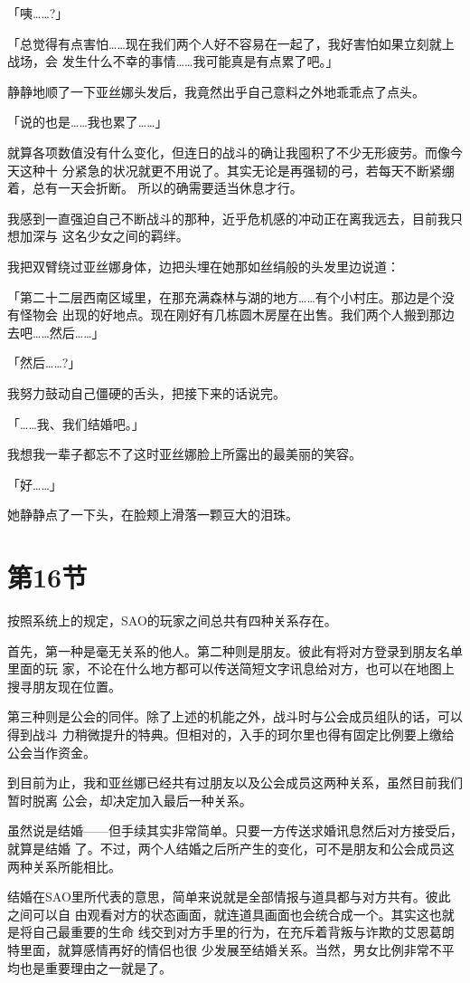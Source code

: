 \documentclass[11pt]{book}
\begin{document}
「咦……?」

「总觉得有点害怕……现在我们两个人好不容易在一起了，我好害怕如果立刻就上战场，会
发生什么不幸的事情……我可能真是有点累了吧。」

静静地顺了一下亚丝娜头发后，我竟然出乎自己意料之外地乖乖点了点头。

「说的也是……我也累了……」

就算各项数值没有什么变化，但连日的战斗的确让我囤积了不少无形疲劳。而像今天这种十
分紧急的状况就更不用说了。其实无论是再强韧的弓，若每天不断紧绷着，总有一天会折断。
所以的确需要适当休息才行。

我感到一直强迫自己不断战斗的那种，近乎危机感的冲动正在离我远去，目前我只想加深与
这名少女之间的羁绊。

我把双臂绕过亚丝娜身体，边把头埋在她那如丝绢般的头发里边说道：

「第二十二层西南区域里，在那充满森林与湖的地方……有个小村庄。那边是个没有怪物会
出现的好地点。现在刚好有几栋圆木房屋在出售。我们两个人搬到那边去吧……然后……」

「然后……?」

我努力鼓动自己僵硬的舌头，把接下来的话说完。

「……我、我们结婚吧。」

我想我一辈子都忘不了这时亚丝娜脸上所露出的最美丽的笑容。

「好……」

她静静点了一下头，在脸颊上滑落一颗豆大的泪珠。
\section{第16节}
\label{sec:org1e3a064}
按照系统上的规定，SAO的玩家之间总共有四种关系存在。

首先，第一种是毫无关系的他人。第二种则是朋友。彼此有将对方登录到朋友名单里面的玩
家，不论在什么地方都可以传送简短文字讯息给对方，也可以在地图上搜寻朋友现在位置。

第三种则是公会的同伴。除了上述的机能之外，战斗时与公会成员组队的话，可以得到战斗
力稍微提升的特典。但相对的，入手的珂尔里也得有固定比例要上缴给公会当作资金。

到目前为止，我和亚丝娜已经共有过朋友以及公会成员这两种关系，虽然目前我们暂时脱离
公会，却决定加入最后一种关系。

虽然说是结婚——但手续其实非常简单。只要一方传送求婚讯息然后对方接受后，就算是结婚
了。不过，两个人结婚之后所产生的变化，可不是朋友和公会成员这两种关系所能相比。

结婚在SAO里所代表的意思，简单来说就是全部情报与道具都与对方共有。彼此之间可以自
由观看对方的状态画面，就连道具画面也会统合成一个。其实这也就是将自己最重要的生命
线交到对方手里的行为，在充斥着背叛与诈欺的艾恩葛朗特里面，就算感情再好的情侣也很
少发展至结婚关系。当然，男女比例非常不平均也是重要理由之一就是了。
\end{document}
